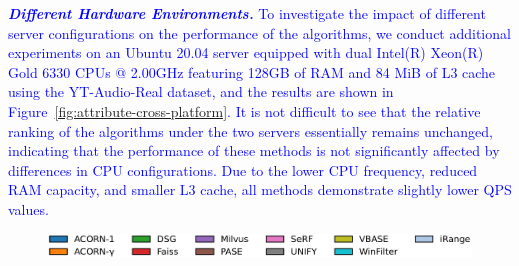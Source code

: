 \documentclass[sigconf, nonacm]{acmart}
\begin{document}
{	\textit{\textbf{\textcolor{blue}{Different Hardware Environments.}}} 
	\textcolor{blue}{To investigate the impact of different server configurations on the performance of the algorithms, we conduct additional experiments on an Ubuntu 20.04 server equipped with dual Intel(R) Xeon(R) Gold 6330 CPUs @ 2.00GHz featuring 128GB of RAM and 84 MiB of L3 cache using the YT-Audio-Real dataset, and the results are shown in Figure~\ref{fig:attribute-cross-platform}. It is not difficult to see that the relative ranking of the algorithms under the two servers essentially remains unchanged, indicating that the performance of these methods is not significantly affected by differences in CPU configurations. Due to the lower CPU frequency, reduced RAM capacity, and smaller L3 cache, all methods demonstrate slightly lower QPS values.}

	
	
	
	
	


	\begin{figure}[t]
		\centering
		
		
		\hspace*{5pt}
		\includegraphics[width=0.98\columnwidth]{figures/indexData/rangeFilter_legend_only.pdf}
		

\end{figure}}
\end{document}
